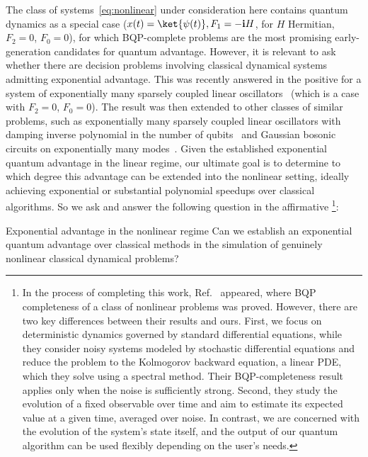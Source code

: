 \documentclass[superscriptaddress,onecolumn,nofootinbib,longbibliography,a4paper,accepted=2026-09-29]{quantumarticle}
\theoremstyle{plain}
\theoremstyle{definition}
\numberwithin{thm}{section}
\numberwithin{assumption}{section}
\numberwithin{lemma}{section}
\numberwithin{prop}{section}
\numberwithin{cor}{section}
\numberwithin{definition}{section}
\numberwithin{rmk}{section}
\numberwithin{equation}{section}
\renewcommand{\i}{\ensuremath{\mathbf{i}}}
\begin{document}
    The class of systems~\eqref{eq:nonlinear} under consideration here contains quantum dynamics as a special case ($x(t) = \ket{\psi(t)}, F_1 = -\i H$, for $H$ Hermitian, $F_2=0$, $F_0 =0$), for which BQP-complete problems are the most promising early-generation candidates for quantum advantage. However, it is relevant to ask whether there are decision problems involving classical dynamical systems admitting exponential advantage. This was recently answered in the positive for a system of exponentially many sparsely coupled linear oscillators~\cite{babbush2023exponential} (which is a case with $F_2=0$, $F_0 =0$). The result was then extended to other classes of similar problems, such as exponentially many sparsely coupled linear oscillators with damping inverse polynomial in the number of qubits~\cite{krovi2024quantum} and Gaussian bosonic circuits on exponentially many modes~\cite{barthe2025gate}. Given the established exponential quantum advantage in the linear regime, our ultimate goal is to determine to which degree this advantage can be extended into the nonlinear setting, ideally achieving exponential or substantial polynomial speedups over classical algorithms. So we ask and answer the following question in the affirmative \footnote{In the process of completing this work, Ref.~\cite{bravyi2025quantum} appeared, where BQP completeness of a class of nonlinear problems was proved. However, there are two key differences between their results and ours. First, we focus on deterministic dynamics governed by standard differential equations, while they consider noisy systems modeled by stochastic differential equations and reduce the problem to the Kolmogorov backward equation, a linear PDE, which they solve using a spectral method. Their BQP-completeness result applies only when the noise is sufficiently strong. Second, they study the evolution of a fixed observable over time and aim to estimate its expected value at a given time, averaged over noise. In contrast, we are concerned with the evolution of the system's state itself, and the output of our quantum algorithm can be used flexibly depending on the user's needs.}:

\begin{questionbox}{Exponential advantage in the nonlinear regime}{}
    Can we establish an exponential quantum advantage over classical methods in the simulation of genuinely nonlinear classical dynamical problems?
\end{questionbox}
\end{document}
